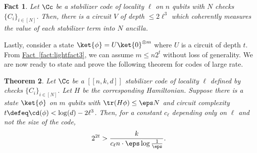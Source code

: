 \documentclass[11pt]{article}
\newcommand{\expref}[2]{\texorpdfstring{\hyperref[#2]{#1~\ref{#2}}}{#1~\ref{#2}}}
\newtheorem{theorem}{Theorem}[section]
\newtheorem{fact}[theorem]{Fact}
\begin{document}
\begin{fact}
\label{fact:efficient_measurement}
Let $\Cc$ be a stabilizer code of locality $\ell$ on $n$ qubits with $N$ checks $\{C_i\}_{i \in [N]}$. Then, there is a circuit $V$ of depth $\leq 2 \ell^3$ which coherently measures the value of each stabilizer term into $N$ ancilla.
\end{fact}

Lastly, consider a state $\ket{\phi}=U\ket{0}^{\otimes m}$ where $U$ is a circuit of depth $t$. From \expref{Fact}{fact:lightfact3}, we can assume $m\leq n 2^t$ without loss of generality. We are now ready to state and prove {the following theorem for codes of large rate.} %

\begin{theorem}
\label{thm:main-technical}
Let $\Cc$ be a $[[n,k,d]]$ stabilizer code of locality $\ell$ defined by checks $\{C_i\}_{i \in [N]}$. Let $H$ be the corresponding Hamiltonian. Suppose there is a state $\ket{\phi}$ on $m$ qubits with $\tr(H\phi) \leq \eps N$ and circuit complexity $t \defeq \cd(\phi) < \log(d) - 2 \ell^3$. Then, for a constant $c_\ell$ depending only on $\ell$ and not the size of the code,
\begin{align}
    2^{2t} > \frac{k}{c_\ell n \cdot \eps\log\frac{1}{\eps}}.
\end{align}
\end{theorem}
\end{document}
